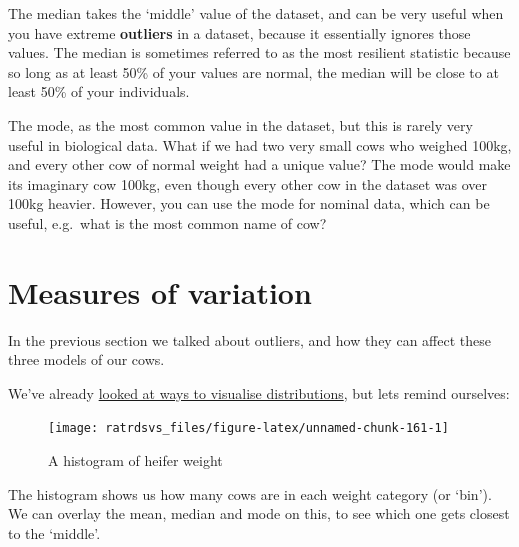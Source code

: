 \documentclass[
]{book}
\newenvironment{Shaded}{\begin{snugshade}}{\end{snugshade}}
\newcommand{\DataTypeTok}[1]{\textcolor[rgb]{0.13,0.29,0.53}{#1}}
\newcommand{\DecValTok}[1]{\textcolor[rgb]{0.00,0.00,0.81}{#1}}
\newcommand{\KeywordTok}[1]{\textcolor[rgb]{0.13,0.29,0.53}{\textbf{#1}}}
\newcommand{\NormalTok}[1]{#1}
\newcommand{\OperatorTok}[1]{\textcolor[rgb]{0.81,0.36,0.00}{\textbf{#1}}}
\newcommand{\StringTok}[1]{\textcolor[rgb]{0.31,0.60,0.02}{#1}}
\begin{document}
The median takes the `middle' value of the dataset, and can be very useful when you have extreme \textbf{outliers} in a dataset, because it essentially ignores those values. The median is sometimes referred to as the most resilient statistic because so long as at least 50\% of your values are normal, the median will be close to at least 50\% of your individuals.

The mode, as the most common value in the dataset, but this is rarely very useful in biological data. What if we had two very small cows who weighed 100kg, and every other cow of normal weight had a unique value? The mode would make its imaginary cow 100kg, even though every other cow in the dataset was over 100kg heavier. However, you can use the mode for nominal data, which can be useful, e.g.~what is the most common name of cow?

\hypertarget{stats_variation}{%
\section{Measures of variation}\label{stats_variation}}

In the previous section we talked about outliers, and how they can affect these three models of our cows.

We've already \protect\hyperlink{vis_hist}{looked at ways to visualise distributions}, but lets remind ourselves:

\begin{Shaded}
\end{Shaded}

\begin{figure}

{\centering \texttt{[image: ratrdsvs\_files/figure-latex/unnamed-chunk-161-1]} 

}

\caption{A histogram of heifer weight}\label{fig:unnamed-chunk-161}
\end{figure}

The histogram shows us how many cows are in each weight category (or `bin'). We can overlay the mean, median and mode on this, to see which one gets closest to the `middle'.
\end{document}
